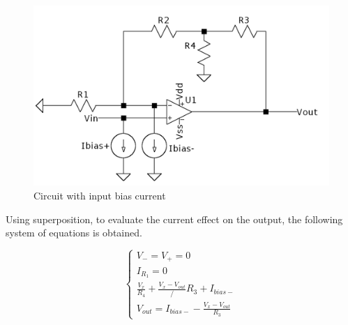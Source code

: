 \begin{figure}[H]
    \centering
    \includegraphics*[scale = 0.25]{Images/Ex1Bias.png}
    \caption{Circuit with input bias current}
    \label{Ex1Bias}
\end{figure}

Using superposition, to evaluate the current effect on the output, the following system of equations is obtained.


\begin{equation}
    \begin{cases}
    
        V_- = V_+ = 0 \\
        I_{R_1} = 0\\
        \frac{V_x}{R_4} + \frac{V_x - V_{out}}/R_3 + I_{bias-}\\
        V_{out} = I_{bias-} - \frac{V_x - V_{out}}{R_3}

    \end{cases}
\end{equation}
